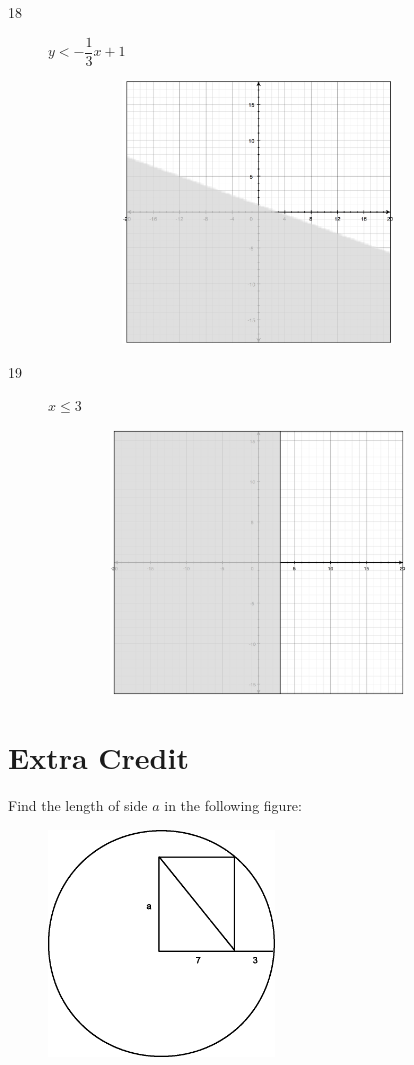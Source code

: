 \documentclass[fleqn,addpoints]{exam}
\begin{document}
\begin{description}
\pagebreak

\item[18]
$y < - \dfrac{1}{3} x + 1$
\begin{figure}[H]
  \includegraphics[width=9cm,height=7cm]{p364/18}
\end{figure}

\item[19]
$x \leq 3$
\begin{figure}[H]
  \includegraphics[width=9cm,height=7cm]{p364/19}
\end{figure}

\end{description}

\fi

\section{Extra Credit}

Find the length of side $a$ in the following figure:

\begin{figure}[H]
  \includegraphics[width=6cm]{extra-credit}
\end{figure}
\label{extra-credit}
\end{document}
